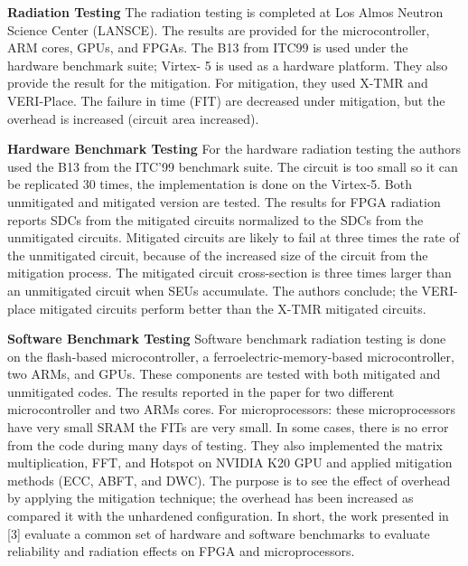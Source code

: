 \textbf{Radiation Testing}
The radiation testing is completed at Los Almos Neutron Science Center (LANSCE). The results are provided for the microcontroller, ARM cores, GPUs, and FPGAs. The B13 from ITC99 is used under the hardware benchmark suite; Virtex- 5 is used as a hardware platform. They also provide the result for the mitigation. For mitigation, they used X-TMR and VERI-Place. The failure in time (FIT) are decreased under mitigation, but the overhead is increased (circuit area increased).

\textbf{Hardware Benchmark Testing}
For the hardware radiation testing the authors used the B13 from the ITC’99 benchmark suite. The circuit is too small so it can be replicated 30 times, the implementation is done on the Virtex-5. Both unmitigated and mitigated version are tested. The results for FPGA radiation reports SDCs from the mitigated circuits normalized to the SDCs from the unmitigated circuits. Mitigated circuits are likely to fail at three times the rate of the unmitigated circuit, because of the increased size of the circuit from the mitigation process. The mitigated circuit cross-section is three times larger than an unmitigated circuit when SEUs accumulate. The authors conclude; the VERI-place mitigated circuits perform better than the X-TMR mitigated circuits.

\textbf{Software Benchmark Testing}
Software benchmark radiation testing is done on the flash-based microcontroller,  a ferroelectric-memory-based microcontroller, two ARMs, and GPUs. These components are tested with both mitigated and unmitigated codes. The results reported in the paper for two different microcontroller and two ARMs cores. For microprocessors: these microprocessors have very small SRAM the FITs are very small. In some cases, there is no error from the code during many days of testing. They also implemented the matrix multiplication, FFT, and Hotspot on NVIDIA K20 GPU and applied mitigation methods (ECC, ABFT, and DWC).  The purpose is to see the effect of overhead by applying the mitigation technique; the overhead has been increased as compared it with the unhardened configuration.
In short, the work presented in [3] evaluate a common set of hardware and software benchmarks to evaluate reliability and radiation effects on FPGA and microprocessors.







